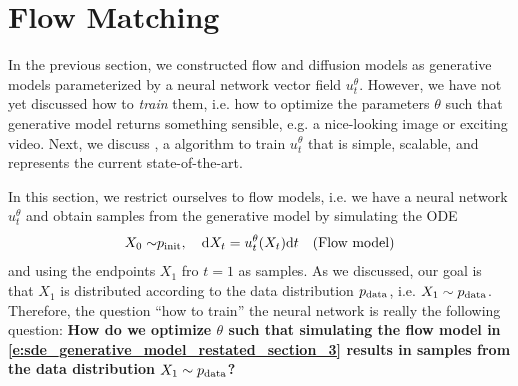 \section{Flow Matching}
\label{sec:flow_matching}

In the previous section, we constructed flow and diffusion models as generative models parameterized by a neural network vector field $u_t^\theta$. However, we have not yet discussed how to \emph{train} them, i.e. how to optimize the parameters $\theta$ such that generative model returns something sensible, e.g. a nice-looking image or exciting video. Next, we discuss  \citep{lipman2022flow,albergo2023stochastic, liu2022flow}, a  algorithm to train $u_t^\theta$ that is simple, scalable, and represents the current state-of-the-art.

In this section, we restrict ourselves to flow models, i.e. we have a neural network $u_t^\theta$ and obtain samples from the generative model by simulating the ODE 
\begin{align}
\label{e:sde_generative_model_restated_section_3}
 X_0\sim&p_{\rm{init}},\quad \mathrm{d} X_t = u_t^\theta(X_t)\mathrm{d} t& \text{(Flow model)}
\end{align}
and using the endpoints $X_1$ fro $t=1$ as samples. As we discussed, our goal is that $X_1$ is distributed according to the data distribution $p_{\rm{data}}$, i.e. $X_1\sim p_{\rm{data}}$. Therefore, the question ``how to train'' the neural network is really the following question: \textbf{How do we optimize $\theta$ such that simulating the flow model in \cref{e:sde_generative_model_restated_section_3} results in samples from the data distribution $X_1\sim p_{\rm{data}}$?} 




